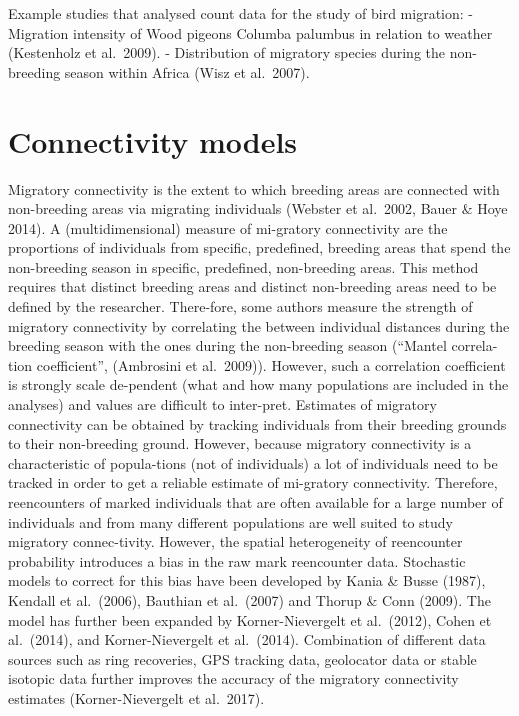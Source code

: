 \documentclass[
]{book}
\begin{document}
Example studies that analysed count data for the study of bird migration:
- Migration intensity of Wood pigeons Columba palumbus in relation to weather (Kestenholz et al.~2009).
- Distribution of migratory species during the non-breeding season within Africa (Wisz et al.~2007).

\hypertarget{connectivity-models}{%
\section{Connectivity models}\label{connectivity-models}}

Migratory connectivity is the extent to which breeding areas are connected with non-breeding areas via migrating individuals (Webster et al.~2002, Bauer \& Hoye 2014). A (multidimensional) measure of mi-gratory connectivity are the proportions of individuals from specific, predefined, breeding areas that spend the non-breeding season in specific, predefined, non-breeding areas. This method requires that distinct breeding areas and distinct non-breeding areas need to be defined by the researcher. There-fore, some authors measure the strength of migratory connectivity by correlating the between individual distances during the breeding season with the ones during the non-breeding season (``Mantel correla-tion coefficient'', (Ambrosini et al.~2009)). However, such a correlation coefficient is strongly scale de-pendent (what and how many populations are included in the analyses) and values are difficult to inter-pret.
Estimates of migratory connectivity can be obtained by tracking individuals from their breeding grounds to their non-breeding ground. However, because migratory connectivity is a characteristic of popula-tions (not of individuals) a lot of individuals need to be tracked in order to get a reliable estimate of mi-gratory connectivity. Therefore, reencounters of marked individuals that are often available for a large number of individuals and from many different populations are well suited to study migratory connec-tivity. However, the spatial heterogeneity of reencounter probability introduces a bias in the raw mark reencounter data. Stochastic models to correct for this bias have been developed by Kania \& Busse (1987), Kendall et al.~(2006), Bauthian et al.~(2007) and Thorup \& Conn (2009). The model has further been expanded by Korner-Nievergelt et al.~(2012), Cohen et al.~(2014), and Korner-Nievergelt et al.~(2014). Combination of different data sources such as ring recoveries, GPS tracking data, geolocator data or stable isotopic data further improves the accuracy of the migratory connectivity estimates (Korner-Nievergelt et al.~2017).
\end{document}
